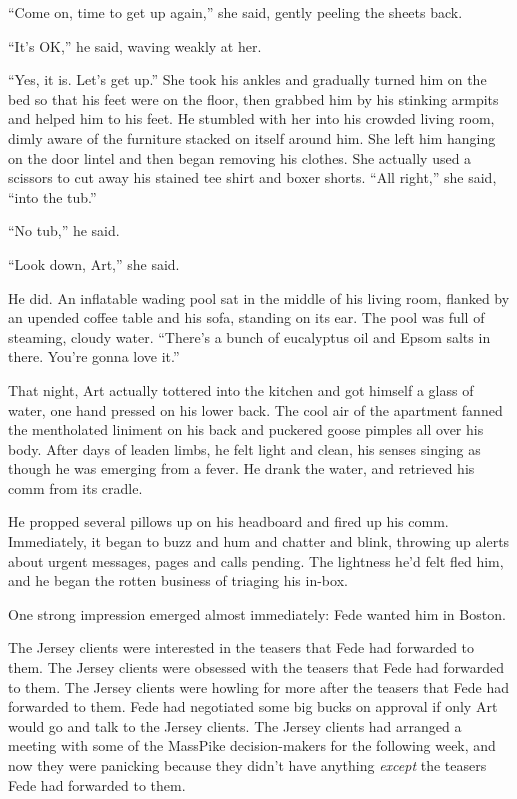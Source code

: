 “Come on, time to get up again,” she said, gently peeling the
sheets back.

“It’s OK,” he said, waving weakly at her.

“Yes, it is. Let’s get up.” She took his ankles and gradually
turned him on the bed so that his feet were on the floor, then
grabbed him by his stinking armpits and helped him to his feet. He
stumbled with her into his crowded living room, dimly aware of the
furniture stacked on itself around him. She left him hanging on the
door lintel and then began removing his clothes. She actually used
a scissors to cut away his stained tee shirt and boxer shorts. “All
right,” she said, “into the tub.”

“No tub,” he said.

“Look down, Art,” she said.

He did. An inflatable wading pool sat in the middle of his living
room, flanked by an upended coffee table and his sofa, standing on
its ear. The pool was full of steaming, cloudy water. “There’s a
bunch of eucalyptus oil and Epsom salts in there. You’re gonna love
it.”

That night, Art actually tottered into the kitchen and got himself
a glass of water, one hand pressed on his lower back. The cool air
of the apartment fanned the mentholated liniment on his back and
puckered goose pimples all over his body. After days of leaden
limbs, he felt light and clean, his senses singing as though he was
emerging from a fever. He drank the water, and retrieved his comm
from its cradle.

He propped several pillows up on his headboard and fired up his
comm. Immediately, it began to buzz and hum and chatter and blink,
throwing up alerts about urgent messages, pages and calls pending.
The lightness he’d felt fled him, and he began the rotten business
of triaging his in-box.

One strong impression emerged almost immediately: Fede wanted him
in Boston.

The Jersey clients were interested in the teasers that Fede had
forwarded to them. The Jersey clients were obsessed with the
teasers that Fede had forwarded to them. The Jersey clients were
howling for more after the teasers that Fede had forwarded to them.
Fede had negotiated some big bucks on approval if only Art would go
and talk to the Jersey clients. The Jersey clients had arranged a
meeting with some of the MassPike decision-makers for the following
week, and now they were panicking because they didn’t have anything
\emph{except} the teasers Fede had forwarded to them.

